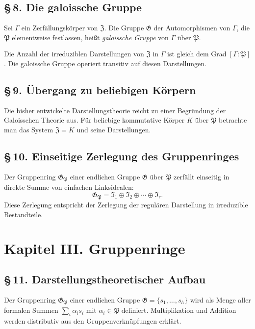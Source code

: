 \documentclass[10pt,a4paper]{article}
\theoremstyle{plain}
\theoremstyle{definition}
\theoremstyle{remark}
\begin{document}
\subsection*{\S\,8. Die galoissche Gruppe}

Sei $\Gamma$ ein Zerf\"allungsk\"orper von $\mathfrak{Z}$. Die Gruppe $\mathfrak{G}$ der Automorphismen von $\Gamma$, die $\mathfrak{P}$ elementweise festlassen, hei\ss t \emph{galoissche Gruppe} von $\Gamma$ \"uber $\mathfrak{P}$.

Die Anzahl der irreduziblen Darstellungen von $\mathfrak{Z}$ in $\Gamma$ ist gleich dem Grad $[\Gamma : \mathfrak{P}]$. Die galoissche Gruppe operiert transitiv auf diesen Darstellungen.

\subsection*{\S\,9. \"Ubergang zu beliebigen K\"orpern}

Die bisher entwickelte Darstellungstheorie reicht zu einer Begr\"undung der Galoisschen Theorie aus. F\"ur beliebige kommutative K\"orper $K$ \"uber $\mathfrak{P}$ betrachte man das System $\mathfrak{Z} = K$ und seine Darstellungen.

\subsection*{\S\,10. Einseitige Zerlegung des Gruppenringes}

Der Gruppenring $\mathfrak{G}_\mathfrak{P}$ einer endlichen Gruppe $\mathfrak{G}$ \"uber $\mathfrak{P}$ zerf\"allt einseitig in direkte Summe von einfachen Linksidealen:
\[
\mathfrak{G}_\mathfrak{P} = \mathfrak{I}_1 \oplus \mathfrak{I}_2 \oplus \cdots \oplus \mathfrak{I}_r.
\]
Diese Zerlegung entspricht der Zerlegung der regul\"aren Darstellung in irreduzible Bestandteile.

\newpage
\section*{Kapitel III. Gruppenringe}

\subsection*{\S\,11. Darstellungstheoretischer Aufbau}

Der Gruppenring $\mathfrak{G}_\mathfrak{P}$ einer endlichen Gruppe $\mathfrak{G} = \{s_1, \ldots, s_h\}$ wird als Menge aller formalen Summen $\sum_i \alpha_i s_i$ mit $\alpha_i \in \mathfrak{P}$ definiert. Multiplikation und Addition werden distributiv aus den Gruppenverkn\"upfungen erkl\"art.
\end{document}
